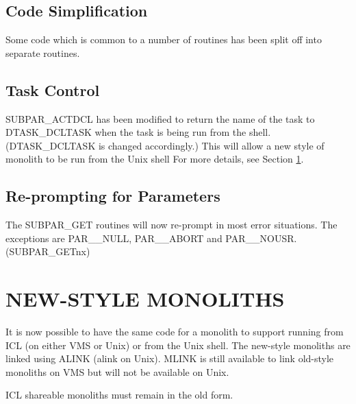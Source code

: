 \subsection{Code Simplification}
Some code which is common to a number of routines has been split off into
separate routines.

\subsection{Task Control}
SUBPAR\_ACTDCL has been modified to return the name of the task to
DTASK\_DCLTASK when the task is being run from the shell.
(DTASK\_DCLTASK is changed accordingly.)
This will allow a new style of monolith to be run from the Unix shell
For more details, see Section \ref{monoliths}.

\subsection{Re-prompting for Parameters}
The SUBPAR\_GET routines will now re-prompt in most error situations. The
exceptions are PAR\_\_NULL, PAR\_\_ABORT and PAR\_\_NOUSR.\\
(SUBPAR\_GETnx)


\section{NEW-STYLE MONOLITHS}
\label{monoliths}
It is now possible to have the same code for a monolith to support running
from ICL (on either VMS or Unix) or from the Unix shell.
The new-style monoliths are linked using ALINK (alink on Unix). MLINK is still
available to link old-style monoliths on VMS but will not be available on Unix.

ICL shareable monoliths must remain in the old form.


